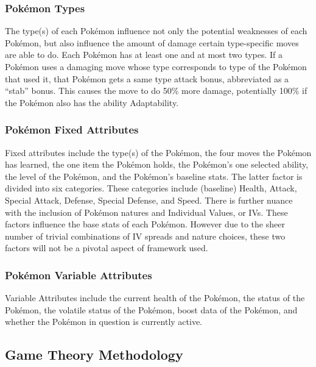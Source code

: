 \documentclass[12pt,twoside]{reedthesis}
\begin{document}
  \subsubsection{Pokémon Types}\label{pokemon-types}
  
  The type(s) of each Pokémon influence not only the potential weaknesses
  of each Pokémon, but also influence the amount of damage certain
  type-specific moves are able to do. Each Pokémon has at least one and at
  most two types. If a Pokémon uses a damaging move whose type corresponds
  to type of the Pokémon that used it, that Pokémon gets a same type
  attack bonus, abbreviated as a ``stab'' bonus. This causes the move to
  do 50\% more damage, potentially 100\% if the Pokémon also has the
  ability Adaptability.
  
  \subsubsection{Pokémon Fixed Attributes}\label{pokemon-fixed-attributes}
  
  Fixed attributes include the type(s) of the Pokémon, the four moves the
  Pokémon has learned, the one item the Pokémon holds, the Pokémon's one
  selected ability, the level of the Pokémon, and the Pokémon's baseline
  stats. The latter factor is divided into six categories. These
  categories include (baseline) Health, Attack, Special Attack, Defense,
  Special Defense, and Speed. There is further nuance with the inclusion
  of Pokémon natures and Individual Values, or IVs. These factors
  influence the base stats of each Pokémon. However due to the sheer
  number of trivial combinations of IV spreads and nature choices, these
  two factors will not be a pivotal aspect of framework used.
  
  \subsubsection{Pokémon Variable
  Attributes}\label{pokemon-variable-attributes}
  
  Variable Attributes include the current health of the Pokémon, the
  status of the Pokémon, the volatile status of the Pokémon, boost data of
  the Pokémon, and whether the Pokémon in question is currently active.
  
  \subsection{Game Theory Methodology}\label{game-theory-methodology}
  
\end{document}
